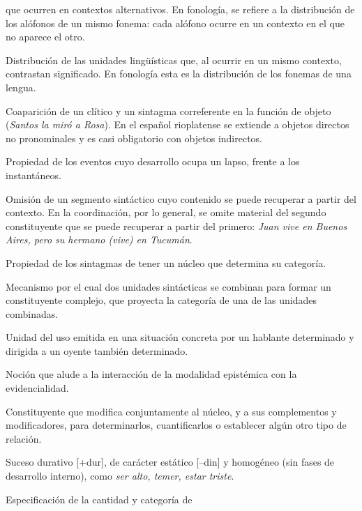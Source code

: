 \begin{glosariogeneral}
        que ocurren en contextos alternativos. En fonología, se refiere a la
        distribución de los alófonos de un mismo fonema: cada alófono ocurre en
        un contexto en el que no aparece el otro.
  \item[Distribución contrastiva:] Distribución de las unidades lingüísticas
        que, al ocurrir en un mismo contexto, contrastan significado. En
        fonología esta es la distribución de los fonemas de una lengua.
  \item[Doblado de clíticos:] Coaparición de un clítico y un sintagma
        correferente en la función de objeto (\textit{Santos la miró a Rosa}).
        En el español rioplatense se extiende a objetos directos no pronominales
        y es casi obligatorio con objetos indirectos.
  \item[Duratividad:] Propiedad de los eventos cuyo desarrollo ocupa un lapso,
        frente a los instantáneos.
  \item[Elipsis:] Omisión de un segmento sintáctico cuyo contenido se puede
        recuperar a partir del contexto. En la coordinación, por lo general, se
        omite material del segundo constituyente que se puede recuperar a partir
        del primero: \textit{Juan vive en Buenos Aires, pero su hermano (vive)
        en Tucumán}.
  \item[Endocentricidad:] Propiedad de los sintagmas de tener un núcleo que
        determina su categoría.
  \item[Ensamble (o fusión):] Mecanismo por el cual dos unidades sintácticas se
        combinan para formar un constituyente complejo, que proyecta la
        categoría de una de las unidades combinadas.
  \item[Enunciado:] Unidad del uso emitida en una situación concreta por un
        hablante determinado y dirigida a un oyente también determinado.
  \item[Epistemicidad:] Noción que alude a la interacción de la modalidad
        epistémica con la evidencialidad.
  \item[Especificador:] Constituyente que modifica conjuntamente al núcleo, y a
        sus complementos y modificadores, para determinarlos, cuantificarlos o
        establecer algún otro tipo de relación.
  \item[Estado:] Suceso durativo [+dur], de carácter estático [--din] y
        homogéneo (sin fases de desarrollo interno), como \textit{ser alto,
        temer, estar triste}.
  \item[Estructura argumental:] Especificación de la cantidad y categoría de

\end{glosariogeneral}
